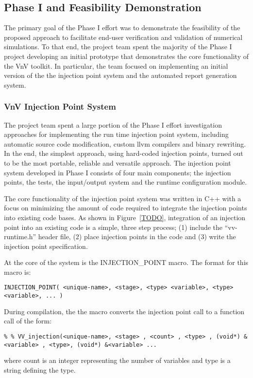 \subsection{Phase I and Feasibility Demonstration}

The primary goal of the Phase I effort was to demonstrate the feasibility of the proposed approach to facilitate end-user 
verification and validation of numerical simulations. To that end, the project team spent the majority of the Phase I
project developing an initial prototype that demonstrates the core functionality of the VnV toolkit. In particular, the team focused on implementing an initial version of the the injection point system and the automated report generation system. 
\subsubsection{VnV Injection Point System}

The project team spent a large portion of the Phase I effort investigation approaches for implementing the run time injection point system, including 
automatic source code modification, custom llvm compilers and binary rewriting. In the end, the simplest approach,
using hard-coded injection points, turned out to be the most portable, reliable and versatile approach. The injection point system developed in Phase I consists of four main components; the injection points, the tests, the input/output system and the runtime configuration module. 

The core functionality of the injection point system was written in C++ with a focus on minimizing the amount of 
code required to integrate the injection points into existing code bases. As shown in Figure~\ref{TODO}, integration of an injection point into an existing code is a simple, three step process; (1) include the ``vv-runtime.h'' header file, (2) place injection points in the code and (3) write the injection point specification. 

At the core of the system is the INJECTION\_POINT macro. The format for this macro is:

\begin{verbatim} 
INJECTION_POINT( <unique-name>, <stage>, <type> <variable>, <type> <variable>, ... )
\end{verbatim}

During compilation, the the macro converts the injection point call to a function call of the form:

\begin{verbatim}
% % VV_injection(<unique-name>, <stage> , <count> , <type> , (void*) &<variable> , <type>, (void*) &<variable> ...
\end{verbatim}
where count is an integer representing the number of variables and type is a string defining the type. 

